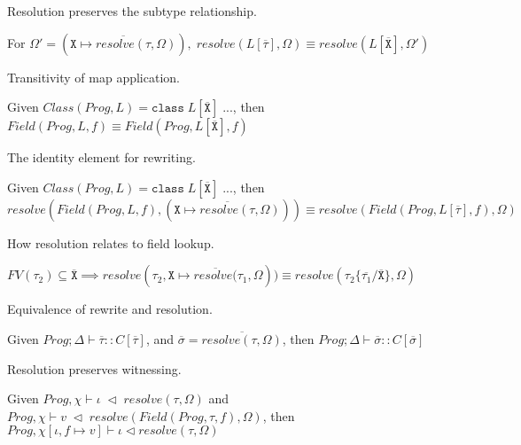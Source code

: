 Resolution preserves the subtype relationship.

\begin{lemma} \label{lemma:3}
For $\Omega' = (\overline{\texttt{X} \mapsto resolve(\tau, \Omega)}), \; resolve(L[\overline{\tau}], \Omega) \equiv resolve(L[\overline{\texttt{X}}], \Omega')$
\end{lemma}

Transitivity of map application.

\begin{lemma} \label{lemma:4}
Given $Class(Prog, L) = \texttt{class} \; L[\overline{\texttt{X}}] \; ...$, then $Field(Prog, L, f) \equiv Field(Prog, L[\overline{\texttt{X}}], f)$
\end{lemma}

The identity element for rewriting.

\begin{lemma} \label{lemma:5}
Given $Class(Prog, L) = \texttt{class} \; L[\overline{\texttt{X}}] \; ...$, then $resolve(Field(Prog, L, f), (\overline{\texttt{X} \mapsto resolve(\tau, \Omega)})) \equiv resolve(Field(Prog, L[\overline{\tau}], f), \Omega)$
\end{lemma}

How resolution relates to field lookup.

\begin{lemma} \label{lemma:6}
$FV(\tau_2) \subseteq \overline{\texttt{X}} \implies resolve(\tau_2, \overline{\texttt{X} \mapsto resolve(\tau_1, \Omega})) \equiv resolve(\tau_2\{\overline{\tau_1}/\overline{\texttt{X}}\}, \Omega)$
\end{lemma}

Equivalence of rewrite and resolution.

\begin{lemma} \label{lemma:7}
Given $Prog; \Delta \vdash \overline{\tau} :: C[\overline{\tau}]$,  and $\overline{\sigma} = \overline{resolve(\tau, \Omega)}$, then $Prog; \Delta \vdash \overline{\sigma} :: C[\overline{\sigma}]$
\end{lemma}

Resolution preserves witnessing.

\begin{lemma} \label{lemma:8}
Given $Prog, \chi \vdash \iota \; \triangleleft \; resolve(\tau, \Omega)$ and $Prog, \chi \vdash v \; \triangleleft \; resolve(Field(Prog, \tau, f), \Omega)$, then $Prog, \chi[\iota, f \mapsto v] \vdash \iota \triangleleft resolve(\tau, \Omega)$
\end{lemma}

